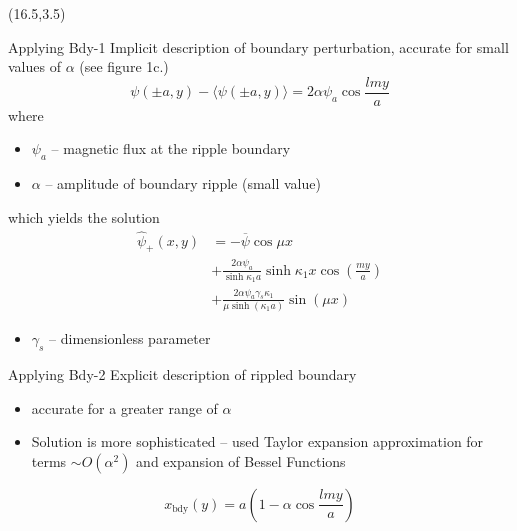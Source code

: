 \documentclass{beamer}
\begin{document}
\begin{frame}[t]
\break

\begin{textblock}{15}(16.5,3.5)
\begin{block}{Applying Bdy-1}
    Implicit description of boundary perturbation, accurate for small values of $\alpha$ \cite{dewar2017} (see figure 1c.)
\begin{equation}
    \label{eq:bdy1}
    \psi\left( \pm a, y \right) - \langle \psi\left( \pm a, y \right) \rangle = 2\alpha \psi_a \cos{\frac{lmy}{a}}
\end{equation} 
where
\begin{itemize}
    \item $\psi_a$ -- magnetic flux at the ripple boundary
    \item $\alpha$ -- amplitude of boundary ripple (small value)
\end{itemize}
\newline
which yields the solution
\begin{equation}
\begin{split}
    \hat{\psi}_+ (x,y) & = -\overline{\psi}\cos{\mu x} \\
                       & + \frac{2\alpha \psi_a}{\sinh{\kappa_1 a}} \sinh{\kappa_1 x} \cos\left( \frac{my}{a} \right) \\
                       & + \frac{2\alpha \psi_a \gamma_s \kappa_1}{\mu \sinh\left( \kappa_1 a \right) } \sin\left( \mu x \right) 
\end{split}
\end{equation}
\begin{itemize}
    \item $\gamma_s$ -- dimensionless parameter
\end{itemize}
\end{block}

\begin{block}{Applying Bdy-2}
    Explicit description of rippled boundary \cite{dewar2017}
\begin{itemize}
    \item accurate for a greater range of $\alpha$ 
    \item Solution is more sophisticated -- used Taylor expansion approximation for terms $\sim O(\alpha^2)$ and expansion of Bessel Functions
\end{itemize}
\begin{equation}
    \label{eq:bdy2}
    x_{\text{bdy}}\left( y \right) =a\left( 1-\alpha\cos{\frac{lmy}{a}} \right) 
\end{equation} 
\end{block}


\end{textblock}
\end{frame}
\end{document}
